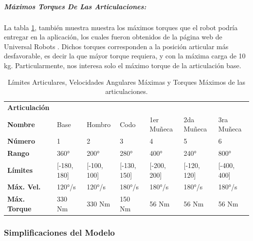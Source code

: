 \documentclass{article}
\begin{document}
\begin{sloppypar}
\subparagraph{Máximos Torques De Las Articulaciones:}
\label{sec:Máximos Torques De Las Articulaciones:}
\hfill \break
La tabla \ref{table:Límites Articulares, Velocidades Angulares Máximas y Torques Máximos de las articulaciones}, también muestra muestra los máximos torques que el robot podría entregar en la aplicación, los cuales fueron obtenidos de la página web de Universal Robots \cite{Torques_Máximos}. Dichos torques corresponden a la posición articular más desfavorable, es decir la que máyor torque requiera, y con la máxima carga de 10 kg. Particularmente, nos interesa solo el máximo torque de la articulación base.

\begin{table}[H]
    \centering
    \begin{tabular}{|l|llllll|}
    \cline{1-1}
    \textbf{Articulación}                                                                             \\ \cline{1-7}
    \textbf{Nombre}    & Base       & Hombro     & Codo       & 1er Muñeca & 2da Muñeca  & 3ra Muñeca \\ \cline{1-7}
    \textbf{Número}    & 1          & 2          & 3          & 4          & 5           & 6          \\ \cline{1-7}
    \textbf{Rango}     & 360°       & 200°       & 280°       & 400°       & 240°        & 800°       \\ \cline{1-7}
    \textbf{Límites}   &[-180, 180] &[-100, 100] &[-130, 150] &[-200, 200] &[-120, 120]  &[-400, 400] \\ \cline{1-7}
    \textbf{Máx. Vel.} & 120°/s     & 120°/s     & 180°/s     & 180°/s     & 180°/s      & 180°/s     \\ \cline{1-7}
    \textbf{Máx. Torque} & 330 Nm   & 330 Nm     & 150 Nm     & 56 Nm      & 56 Nm       & 56 Nm     \\ \cline{1-7}
    \end{tabular}
    \caption{\label{table:Límites Articulares, Velocidades Angulares Máximas y Torques Máximos de las articulaciones}Límites Articulares, Velocidades Angulares Máximas y Torques Máximos de las articulaciones.}
\end{table}



\subsubsection{Simplificaciones del Modelo}
\label{sec:Simplificaciones del Modelo}


\end{sloppypar}
\end{document}
